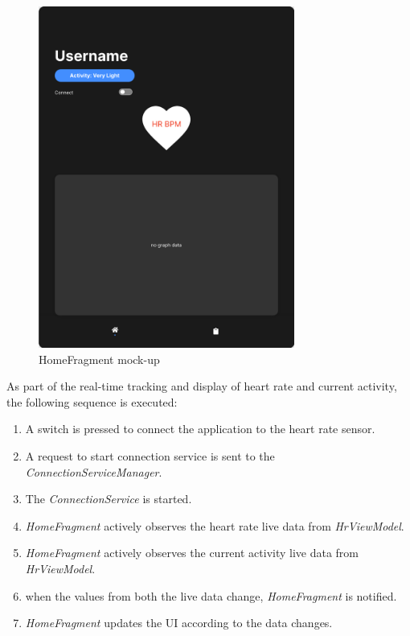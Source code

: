 \begin{figure}[H]
    \centering
    \includegraphics[width=0.75\textwidth]{images/home-fragment-mockup.png}
    \caption{HomeFragment mock-up}
    \label{fig:homefragment_mockup}
\end{figure}

As part of the real-time tracking and display of heart rate and current activity, the following sequence is executed:
\begin{enumerate}
    \item A switch is pressed to connect the application to the heart rate sensor.
    \item A request to start connection service is sent to the \emph{ConnectionServiceManager}.
    \item The \emph{ConnectionService} is started.
    \item \emph{HomeFragment} actively observes the heart rate live data from \emph{HrViewModel}.
    \item \emph{HomeFragment} actively observes the current activity live data from \emph{HrViewModel}.
    \item when the values from both the live data change, \emph{HomeFragment} is notified.
    \item \emph{HomeFragment} updates the UI according to the data changes.

\end{enumerate}

